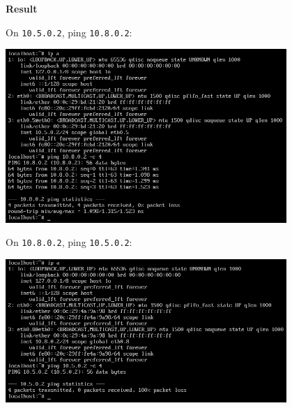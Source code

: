 \documentclass[12pt, a4paper]{article}
\begin{document}
\begin{enumerate}[resume]
    \textbf{Result}

    On \verb|10.5.0.2|, ping \verb|10.8.0.2|:

    \includegraphics[width=0.8\textwidth]{9_vlan5_to_vlan8.png}

    On \verb|10.8.0.2|, ping \verb|10.5.0.2|:

    \includegraphics[width=0.8\textwidth]{9_vlan8_to_vlan5.png}


\end{enumerate}
\end{document}
